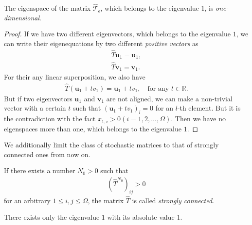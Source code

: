 \begin{theorem}
	The eigenspace of the matrix $\hat{\mathcal{T}}_{\epsilon}$, which belongs to the eigenvalue $1$, is \textit{one-dimensional}. 
\end{theorem}

\begin{proof}
	If we have two different eigenvectors, which belongs to the eigenvalue $1$, we can write their eigenequations by two different \textit{positive vectors} as
	\begin{align}
	\hat{T}\bm{u}_{1} = \bm{u}_{1},\\
	\hat{T}\bm{v}_{1} = \bm{v}_{1}.
	\end{align}
	For their any linear superposition, we also have
	\begin{align}
	\hat{T}(\bm{u}_{1} + t{v}_{1}) = \bm{u}_{1} + t{v}_{1},\quad\text{for any $t\in\mathbb{R}$}.
	\end{align}
	But if two eigenvectors $\bm{u}_{1}$ and $\bm{v}_{1}$ are not aligned, we can make a non-trivial vector with a certain $t$ such that $\left(\bm{u}_{1} + t{v}_{1}\right)_{l} = 0$ for an $l$-th element. But it is the contradiction with the fact $x_{1,i}>0(i=1,2,\dots,\Omega)$. Then we have no eigenspaces more than one, which belongs to the eigenvalue $1$.
\end{proof}

We additionally limit the class of stochastic matrices to that of strongly connected ones from now on.
\begin{definition}
	If there exists a number $N_{0}>0$ such that
	\begin{align}
	\left(\hat{T}^{N_{0}}\right)_{ij}>0
	\end{align}
	for an arbitrary $1\leq i,j\leq \Omega$, the matrix $\hat{T}$ is called \textit{strongly connected}.
\end{definition}

\begin{theorem}
	There exists only the eigenvalue $1$ with its absolute value $1$.
\end{theorem}

